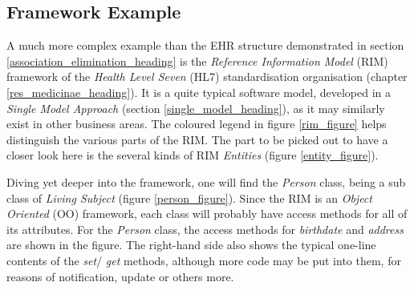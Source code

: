 %
%
%
%
%
%
%

\subsection{Framework Example}
\label{framework_example_heading}

A much more complex example than the EHR structure demonstrated in section
\ref{association_elimination_heading} is the \emph{Reference Information Model}
(RIM) framework of the \emph{Health Level Seven} (HL7) standardisation
organisation (chapter \ref{res_medicinae_heading}). It is a quite typical
software model, developed in a \emph{Single Model Approach} (section
\ref{single_model_heading}), as it may similarly exist in other business areas.
The coloured legend in figure \ref{rim_figure} helps distinguish the various
parts of the RIM. The part to be picked out to have a closer look here is the
several kinds of RIM \emph{Entities} (figure \ref{entity_figure}).

Diving yet deeper into the framework, one will find the \emph{Person} class,
being a sub class of \emph{Living Subject} (figure \ref{person_figure}). Since
the RIM is an \emph{Object Oriented} (OO) framework, each class will probably
have access methods for all of its attributes. For the \emph{Person} class, the
access methods for \emph{birthdate} and \emph{address} are shown in the figure.
The right-hand side also shows the typical one-line contents of the \emph{set}/
\emph{get} methods, although more code may be put into them, for reasons of
notification, update or others more.

